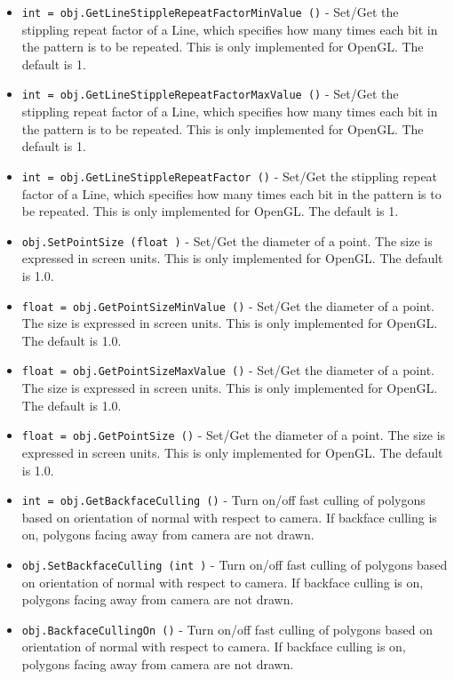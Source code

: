 \begin{itemize}
\item  \verb|int = obj.GetLineStippleRepeatFactorMinValue ()| -  Set/Get the stippling repeat factor of a Line, which specifies how
 many times each bit in the pattern is to be repeated.
 This is only implemented for OpenGL. The default is 1.

\item  \verb|int = obj.GetLineStippleRepeatFactorMaxValue ()| -  Set/Get the stippling repeat factor of a Line, which specifies how
 many times each bit in the pattern is to be repeated.
 This is only implemented for OpenGL. The default is 1.

\item  \verb|int = obj.GetLineStippleRepeatFactor ()| -  Set/Get the stippling repeat factor of a Line, which specifies how
 many times each bit in the pattern is to be repeated.
 This is only implemented for OpenGL. The default is 1.

\item  \verb|obj.SetPointSize (float )| -  Set/Get the diameter of a point. The size is expressed in screen units.
 This is only implemented for OpenGL. The default is 1.0.

\item  \verb|float = obj.GetPointSizeMinValue ()| -  Set/Get the diameter of a point. The size is expressed in screen units.
 This is only implemented for OpenGL. The default is 1.0.

\item  \verb|float = obj.GetPointSizeMaxValue ()| -  Set/Get the diameter of a point. The size is expressed in screen units.
 This is only implemented for OpenGL. The default is 1.0.

\item  \verb|float = obj.GetPointSize ()| -  Set/Get the diameter of a point. The size is expressed in screen units.
 This is only implemented for OpenGL. The default is 1.0.

\item  \verb|int = obj.GetBackfaceCulling ()| -  Turn on/off fast culling of polygons based on orientation of normal
 with respect to camera. If backface culling is on, polygons facing
 away from camera are not drawn.

\item  \verb|obj.SetBackfaceCulling (int )| -  Turn on/off fast culling of polygons based on orientation of normal
 with respect to camera. If backface culling is on, polygons facing
 away from camera are not drawn.

\item  \verb|obj.BackfaceCullingOn ()| -  Turn on/off fast culling of polygons based on orientation of normal
 with respect to camera. If backface culling is on, polygons facing
 away from camera are not drawn.


\end{itemize}
